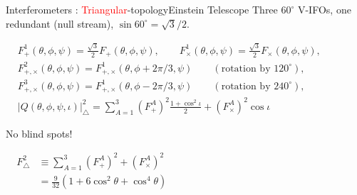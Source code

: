 \documentclass[xcolor=dvipsnames,handout,t]{beamer}
\newcommand{\red}[1]{\textcolor{red}{#1}}
\newcommand{\f}{\frac}
\begin{document}
\begin{frame}{Interferometers : \red{Triangular}-topology}{Einstein Telescope}
\vspace{-2mm}
  Three $60^\circ$ V-IFOs, one redundant (null stream), $\sin 60^\circ =\sqrt{3}/2$.
  \begin{footnotesize}
  \begin{align*}
    &F^1_+(\theta,\phi,\psi)= \f{\sqrt{3}}{2} F_+(\theta,\phi,\psi), \qquad F^1_\times(\theta,\phi,\psi)= \f{\sqrt{3}}{2} F_\times(\theta,\phi,\psi),\hspace{2cm}\\
    & F^2_{+,\times}(\theta,\phi,\psi) = F^1_{+,\times}(\theta,\phi+2\pi/3,\psi)\qquad (\text{rotation by 120}^\circ),\\
    & F^3_{+,\times}(\theta,\phi,\psi) = F^1_{+,\times}(\theta,\phi-2\pi/3,\psi) \qquad(\text{rotation by 240}^\circ),\\
    &  |Q(\theta,\phi,\psi,\iota)|_\bigtriangleup^2 = \sum_{A=1}^3 \left(F^A_+\right)^2\f{1+\cos^2\iota}{2}  + \left(F^A_\times\right)^2 \cos\iota
    \end{align*}
    \end{footnotesize}
   No blind spots!
   \begin{footnotesize}
  \begin{align*}
   F^2_\bigtriangleup &\equiv \sum_{A=1}^3 \left(F^A_+\right)^2+\left(F^A_\times\right)^2 \hspace{8cm}\\ 
   &= \f{9}{32}\left(1+6\cos^2\theta + \cos^4\theta\right)
  \end{align*}
  \end{footnotesize}

   
\end{frame}
\end{document}
